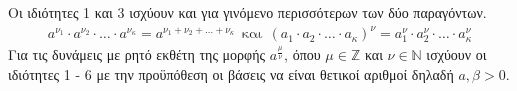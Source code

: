 \documentclass[twoside,nofonts,internet,shmeiwseis]{thewria}
\begin{document}
\vspace{-10mm}
Οι ιδιότητες 1 και 3 ισχύουν και για γινόμενο περισσότερων των δύο παραγόντων.
\begin{gather*}
a^{\nu_1}\cdot a^{\nu_2}\cdot\ldots\cdot a^{\nu_\kappa}=a^{\nu_1+\nu_2+\ldots+\nu_\kappa}\ \ \textrm{και}\ \ 
\left( a_1\cdot a_2\cdot\ldots\cdot a_\kappa\right)^\nu=a_1^\nu\cdot a_2^\nu\cdot\ldots\cdot a_\kappa^\nu
\end{gather*}
Για τις δυνάμεις με ρητό εκθέτη της μορφής $ a^{\frac{\mu}{\nu}} $, όπου $ \mu\in\mathbb{Z} $ και $ \nu\in\mathbb{N} $ ισχύουν οι ιδιότητες 1 - 6 με την προϋπόθεση οι βάσεις να είναι θετικοί αριθμοί δηλαδή $ a,\beta>0 $.\\\\
\end{document}
